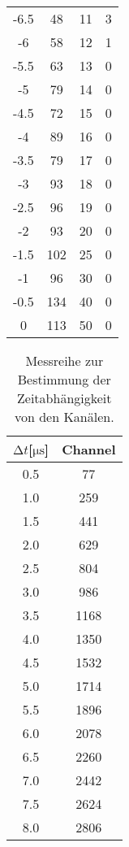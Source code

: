 \begin{table}
\begin{tabular}{c c || c c}
        -6.5   &   48     &    11      &   3    \\
        -6     &   58     &    12      &   1    \\
        -5.5   &   63     &    13      &   0    \\
        -5     &   79     &    14      &   0    \\
        -4.5   &   72     &    15      &   0    \\
        -4     &   89     &    16      &   0    \\
        -3.5   &   79     &    17      &   0    \\
        -3     &   93     &    18      &   0    \\
        -2.5   &   96     &    19      &   0    \\
        -2     &   93     &    20      &   0    \\
        -1.5   &   102    &    25      &   0    \\
        -1     &   96     &    30      &   0    \\
        -0.5   &   134    &    40      &   0    \\
        0      &   113    &       50   &   0    \\
    \end{tabular}
\end{table}
 
\begin{table}
    \centering
    \caption{Messreihe zur Bestimmung der Zeitabhängigkeit von den Kanälen.} 
    \label{tab:1122332211}
    \begin{tabular}{c c}
        \toprule
        $\increment t$[$\si{\micro\second}$] & Channel \\
        \midrule
        0.5   &  77\\
        1.0     &  259\\ 
        1.5   &  441\\
        2.0     &  629\\
        2.5   &  804\\
        3.0     &  986\\
        3.5   &  1168\\
        4.0     &  1350\\
        4.5   &  1532\\
        5.0     &  1714\\
        5.5   &  1896\\
        6.0     &  2078\\
        6.5   &  2260\\
        7.0     &  2442\\
        7.5   &  2624\\
        8.0     &  2806\\
    \end{tabular}
\end{table}
